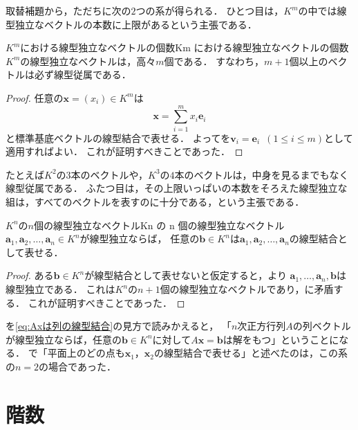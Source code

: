 取替補題から，ただちに次の$2$つの系が得られる．
ひとつ目は，$K^m$の中では線型独立なベクトルの本数に上限があるという主張である．

\begin{cor}{$K^m$における線型独立なベクトルの個数}{Km における線型独立なベクトルの個数}
  $K^m$の線型独立なベクトルは，高々$m$個である．
  すなわち，$m + 1$個以上のベクトルは必ず線型従属である．
\end{cor}

\begin{tleftbar}
\begin{proof}
  任意の$\bm{x} = (x_i) \in K^m$は
  \[
    \bm{x} = \sum_{i=1}^{m} x_i \bm{e}_i
  \]
  と標準基底ベクトルの線型結合で表せる．
  よってを$\bm{v}_i = \bm{e}_i$~$(1 \le i \le m)$として適用すればよい．
  これが証明すべきことであった．
\end{proof}
\end{tleftbar}

たとえば$K^2$の$3$本のベクトルや，$K^3$の$4$本のベクトルは，中身を見るまでもなく線型従属である．
ふたつ目は，その上限いっぱいの本数をそろえた線型独立な組は，すべてのベクトルを表すのに十分である，という主張である．

\begin{cor}{$K^n$の$n$個の線型独立なベクトル}{Kn の n 個の線型独立なベクトル}
  $\bm{a}_1, \bm{a}_2, \dots, \bm{a}_n \in K^n$が線型独立ならば，
  任意の$\bm{b} \in K^n$は$\bm{a}_1, \bm{a}_2, \dots, \bm{a}_n$の線型結合として表せる．
\end{cor}

\begin{tleftbar}
\begin{proof}
  ある$\bm{b} \in K^n$が線型結合として表せないと仮定すると，より
  $\bm{a}_1, \dots, \bm{a}_n, \bm{b}$は線型独立である．
  これは$K^n$の$n + 1$個の線型独立なベクトルであり，に矛盾する．
  これが証明すべきことであった．
\end{proof}
\end{tleftbar}

を\eqref{eq:Axは列の線型結合}の見方で読みかえると，
「$n$次正方行列$A$の列ベクトルが線型独立ならば，任意の$\bm{b} \in K^n$に対して$A\bm{x} = \bm{b}$は解をもつ」ということになる．
で「平面上のどの点も$\bm{x}_1$，$\bm{x}_2$の線型結合で表せる」と述べたのは，この系の$n = 2$の場合であった．

\section{階数}

